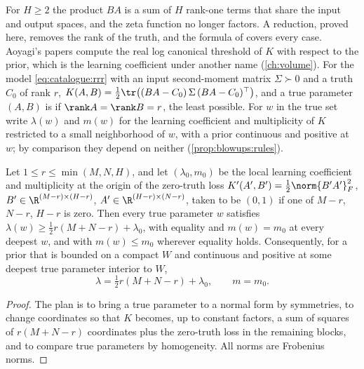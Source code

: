 \begin{refsection}
For $H\ge2$ the product $BA$ is a sum of $H$ rank-one terms that share the input and output spaces, and the zeta function no longer factors. A reduction, proved here, removes the rank of the truth, and the formula of \textcite{AoyagiWatanabe2005} covers every case. Aoyagi's papers compute the real log canonical threshold of $K$ with respect to the prior, which is the learning coefficient under another name (\cref{ch:volume}). For the model \eqref{eq:catalogue:rrr} with an input second-moment matrix $\Sigma\succ0$ and a truth $C_0$ of rank $r$, $K(A,B)=\tfrac12\tr\bigl((BA-C_0)\,\Sigma\,(BA-C_0)^\top\bigr)$, and a true parameter $(A,B)$ is  if $\rank A=\rank B=r$, the least possible. For $w$ in the true set write $\lambda(w)$ and $m(w)$ for the learning coefficient and multiplicity of $K$ restricted to a small neighborhood of $w$, with a prior continuous and positive at $w$; by comparison they depend on neither (\cref{prop:blowups:rules}).

\begin{proposition}\label{prop:catalogue:reduction}
Let $1\le r\le\min(M,N,H)$, and let $(\lambda_0,m_0)$ be the local learning coefficient and multiplicity at the origin of the zero-truth loss $K'(A',B')=\frac12\norm{B'A'}_F^2$, $B'\in\R^{(M-r)\times(H-r)}$, $A'\in\R^{(H-r)\times(N-r)}$, taken to be $(0,1)$ if one of $M-r$, $N-r$, $H-r$ is zero. Then every true parameter $w$ satisfies $\lambda(w)\ge\tfrac12r(M+N-r)+\lambda_0$, with equality and $m(w)=m_0$ at every deepest $w$, and with $m(w)\le m_0$ wherever equality holds. Consequently, for a prior that is bounded on a compact $W$ and continuous and positive at some deepest true parameter interior to $W$,
\[
\lambda=\tfrac12r(M+N-r)+\lambda_0,\qquad m=m_0.
\]
\end{proposition}

\begin{proof}
The plan is to bring a true parameter to a normal form by symmetries, to change coordinates so that $K$ becomes, up to constant factors, a sum of squares of $r(M+N-r)$ coordinates plus the zero-truth loss in the remaining blocks, and to compare true parameters by homogeneity. All norms are Frobenius norms.


\end{proof}
\end{refsection}
